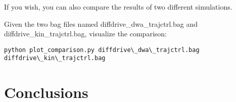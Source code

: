 \documentclass[11pt,a4paper]{article}
\begin{document}
If you wish, you can also compare the results of two different simulations.

Given the two bag files named diffdrive\_dwa\_trajctrl.bag and diffdrive\_kin\_trajctrl.bag, visualize the comparison:
\begin{lstlisting}
python plot_comparison.py diffdrive\_dwa\_trajctrl.bag diffdrive\_kin\_trajctrl.bag
\end{lstlisting}



\section{Conclusions}
\end{document}
